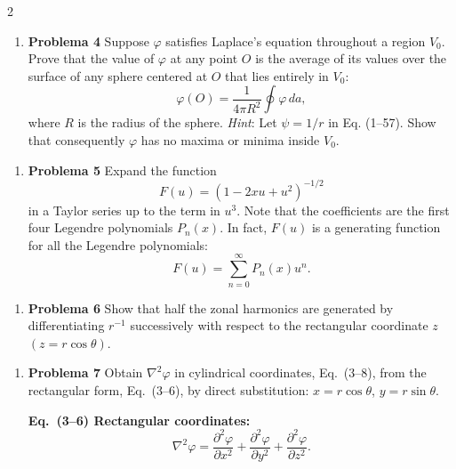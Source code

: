 \documentclass{article}
\newenvironment{MyColorPar}[1]{%
\leavevmode\color{#1}\ignorespaces%
}{%
}%
\begin{document}
\begin{multicols}{2}
\begin{enumerate}[label={{\textcolor{trueblue}{\textbf{Pr.} \arabic*.4}}}, start=3]
\item \textbf{Problema 4} Suppose $\varphi$ satisfies Laplace’s equation throughout a region $V_{0}$. Prove that the value of $\varphi$ at any point $O$ is the average of its values over the surface of any sphere centered at $O$ that lies entirely in $V_{0}$:
\[
\varphi(O) = \frac{1}{4\pi R^{2}} \oint \varphi \, da,
\]
where $R$ is the radius of the sphere. \emph{Hint}: Let $\psi = 1/r$ in Eq. (1–57). Show that consequently $\varphi$ has no maxima or minima inside $V_{0}$.
\end{enumerate}

\begin{enumerate}[label={{\textcolor{trueblue}{\textbf{Pr.} \arabic*.5}}}, start=3]
\item \textbf{Problema 5} Expand the function
\[
F(u) = (1 - 2xu + u^{2})^{-1/2}
\]
in a Taylor series up to the term in $u^{3}$. Note that the coefficients are the first four Legendre polynomials $P_{n}(x)$. In fact, $F(u)$ is a generating function for all the Legendre polynomials:
\[
F(u) = \sum_{n=0}^{\infty} P_{n}(x) u^{n}.
\]
\end{enumerate}
		
\begin{enumerate}[label={{\textcolor{trueblue}{\textbf{Pr.} \arabic*.6}}}, start=3]
\item \textbf{Problema 6} Show that half the zonal harmonics are generated by differentiating $r^{-1}$ successively with respect to the rectangular coordinate $z$ $(z = r \cos \theta)$.
\end{enumerate}

\begin{enumerate}[label={{\textcolor{trueblue}{\textbf{Pr.} \arabic*.7}}}, start=3]
\item \textbf{Problema 7} Obtain $\nabla^{2}\varphi$ in cylindrical coordinates, Eq.~(3–8), from the rectangular form, Eq.~(3–6), by direct substitution: $x = r \cos \theta$, $y = r \sin \theta$.

\begin{MyColorPar}{orange(colorwheel)}
\textbf{Eq.~(3–6) Rectangular coordinates:}
\[
\nabla^{2}\varphi = 
\frac{\partial^{2}\varphi}{\partial x^{2}} +
\frac{\partial^{2}\varphi}{\partial y^{2}} +
\frac{\partial^{2}\varphi}{\partial z^{2}} .
\]


\end{MyColorPar}
\end{enumerate}
\end{multicols}
\end{document}
